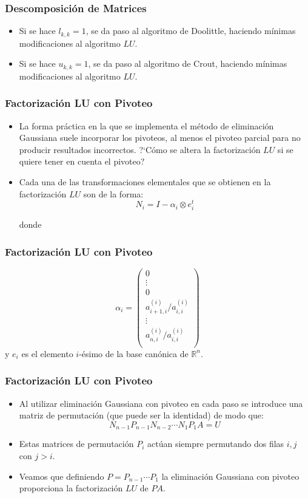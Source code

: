 \documentclass{beamer}
\begin{document}
\begin{frame}
\frametitle{Descomposici\'on de Matrices}
\begin{itemize}
\item Si se hace $l_{k,k}=1$, se da paso al algoritmo de Doolittle, haciendo m\'inimas modificaciones al algoritmo $LU$.
\item<2-> Si se hace $u_{k,k}=1$, se da paso al algoritmo de Crout, haciendo m\'inimas modificaciones al algoritmo $LU$.
\end{itemize}
\end{frame}
\begin{frame}
  \frametitle{Factorizaci\'on LU con Pivoteo}
  \begin{itemize}
    \item La forma pr\'actica en la que se implementa el m\'etodo de eliminaci\'on Gaussiana suele incorporar los pivoteos, al menos el pivoteo parcial para no producir resultados incorrectos. ?`C\'omo se altera la factorizaci\'on $LU$ si se quiere tener en cuenta el pivoteo?
    
    \item<2->Cada una de las transformaciones elementales que se obtienen en la factorizaci\'on $LU$ son de la forma:    
    $$
    N_i = I - \alpha_i \otimes e_i^t
    $$
    
    donde   
  \end{itemize}
\end{frame}
\begin{frame}
  \frametitle{Factorizaci\'on LU con Pivoteo}
$$
    \alpha_i = \left(\begin{array}{c}
                      0\\
                      \vdots\\
                      0\\
                      a_{i+1,i}^{(i)}/a_{i,i}^{(i)}\\
                      \vdots\\
                      a_{n,i}^{(i)}/a_{i,i}^{(i)}\\
                     \end{array}
    \right)
    $$    
    y $e_i$ es el elemento $i$-\'esimo de la base can\'onica de $\mathbb{R}^n$.
\end{frame}
\begin{frame}
  \frametitle{Factorizaci\'on LU con Pivoteo}
  \begin{itemize}
    \item<1->Al utilizar eliminaci\'on Gaussiana con pivoteo en cada paso se introduce una matriz de permutaci\'on (que puede ser la
    identidad) de modo que:
    $$
    N_{n-1}P_{n-1}N_{n-2}\cdots N_1P_1A = U
    $$
    \item<2->Estas matrices de permutaci\'on $P_i$ act\'uan siempre permutando dos filas $i,j$ con $j > i$.
    \item<3->Veamos que definiendo $P = P_{n-1}\cdots P_1$ la eliminaci\'on Gaussiana con pivoteo proporciona la factorizaci\'on $LU$ de $PA$.
  \end{itemize}
\end{frame}
\end{document}
